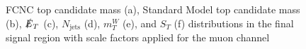 \begin{figure}[]
\hfil  %
\caption{FCNC top candidate mass (a), Standard Model top candidate mass (b), $\slashed{E}_T$ (c), $N_\text{jets}$ (d),  $m_T^W$ (e), and $S_T$ (f) distributions in the final signal region with scale factors applied for the muon channel}
\label{fig:SRmuj2}
\end{figure}


